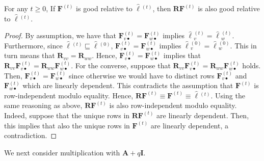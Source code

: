\begin{lemma}\label{lem:rightgood}
	For any $t\geq 0$,
	If $\mathbf{F}^{(t)}$ is good relative to $\hat{\pmb{\ell}}{}^{(t)}$, then $\mathbf{R}\mathbf{F}^{(t)}$ is also good relative to $\hat{\pmb{\ell}}{}^{(t)}$.
\end{lemma}
\begin{proof}
By assumption, we have that $\mathbf{F}^{(t)}_{v\bullet}=\mathbf{F}^{(t)}_{w\bullet}$ implies 
$\hat{\pmb{\ell}}{}^{(t)}_{v}=\hat{\pmb{\ell}}{}^{(t)}_w$. Furthermore, since $\hat{\pmb{\ell}}{}^{(t)}\sqsubseteq\hat{\pmb{\ell}}{}^{(0)}$,
$\mathbf{F}^{(t)}_{v\bullet}=\mathbf{F}^{(t)}_{w\bullet}$ implies  $\hat{\pmb{\ell}}{}^{(0)}_{v}=\hat{\pmb{\ell}}{}^{(0)}_w$. This in turn means that 
$\mathbf{R}_{vv}=\mathbf{R}_{ww}$. Hence, $\mathbf{F}^{(t)}_{v\bullet}=\mathbf{F}^{(t)}_{w\bullet}$  implies that 
$\mathbf{R}_{vv}\mathbf{F}^{(t)}_{v\bullet}=\mathbf{R}_{ww}\mathbf{F}^{(t)}_{w\bullet}$.
For the converse, suppose that $\mathbf{R}_{vv}\mathbf{F}^{(t)}_{v\bullet}=\mathbf{R}_{ww}\mathbf{F}^{(t)}_{w\bullet}$ holds.
Then, $\mathbf{F}^{(t)}_{v\bullet}=\mathbf{F}^{(t)}_{w\bullet}$ since otherwise we would have to
distinct rows $\mathbf{F}^{(t)}_{v\bullet}$ and $\mathbf{F}^{(t)}_{w\bullet}$ which are linearly dependent. This contradicts the assumption that $\mathbf{F}^{(t)}$ is row-independent modulo equality.
Hence, $\mathbf{R}\mathbf{F}^{(t)}\equiv\mathbf{F}^{(t)}\equiv\hat{\pmb{\ell}}{}^{(t)}$. Using the same reasoning as above, $\mathbf{R}\mathbf{F}^{(t)}$ is also row-independent modulo equality. Indeed, suppose that the unique rows in $\mathbf{R}\mathbf{F}^{(t)}$ are linearly dependent. Then, this implies that also the unique rows in $\mathbf{F}^{(t)}$ are linearly dependent, a contradiction. 
\end{proof}

We next consider multiplication with $\mathbf{A}+q\mathbf{I}$. 

